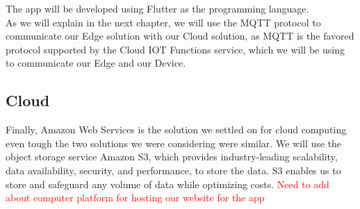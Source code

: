 The app will be developed using Flutter as the programming language.\\
As we will explain in the next chapter, we will use the MQTT protocol to communicate our Edge solution with our Cloud solution, as MQTT is the favored protocol supported by the Cloud IOT Functions service, which we will be using to communicate our Edge and our Device.

\subsection{Cloud}
Finally, Amazon Web Services is the solution we settled on for cloud computing even tough the two solutions we were considering were similar. We will use the object storage service Amazon S3, which provides industry-leading scalability, data availability, security, and performance, to store the data. S3 enables us to store and safeguard any volume of data while optimizing costs. 
\textcolor{red}{Need to add about computer platform for hosting our website for the app}